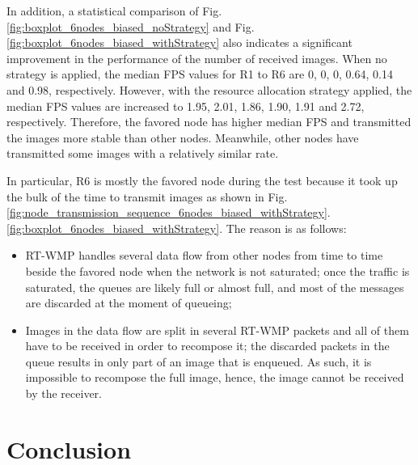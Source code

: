 \documentclass[journal]{IEEEtran}  %
\begin{document}
In addition, a statistical comparison of Fig.
\ref{fig:boxplot_6nodes_biased_noStrategy} and Fig.
\ref{fig:boxplot_6nodes_biased_withStrategy} also indicates a significant
improvement in the performance of the number of received images. 
When no strategy is applied, the median FPS values for R1 to R6 are 0,
 0, 0, 0.64, 0.14 and 0.98, respectively.  
However, with the resource allocation strategy applied, the median FPS values
are increased to 1.95, 2.01, 1.86, 1.90, 1.91 and 2.72, respectively.
Therefore, the favored node has higher median FPS and transmitted the images
more stable than other nodes.
Meanwhile, other nodes have transmitted some images 
with a relatively similar rate.

In particular, 
R6 is mostly the favored node during the test because it took up the bulk of
the time to transmit images as shown in Fig.
\ref{fig:node_transmission_sequence_6nodes_biased_withStrategy}.
\ref{fig:boxplot_6nodes_biased_withStrategy}.
The reason is as follows:
\begin{itemize}
\item 
RT-WMP handles several data flow from other nodes from time to time beside the
favored node when the network is not saturated;
 once the traffic is saturated, the queues are likely full or almost full, and
 most of the messages are discarded at the moment of queueing; 
\item
 Images in the data flow are split in several RT-WMP packets and all of them
 have to be received in order to recompose it;  
the discarded packets in the queue results in only part of an image that is
enqueued. As such, it is impossible to recompose the full image, hence, the
image cannot be received by the receiver.
\end{itemize}

\section{Conclusion}
\label{sec:conclusion}
\end{document}
